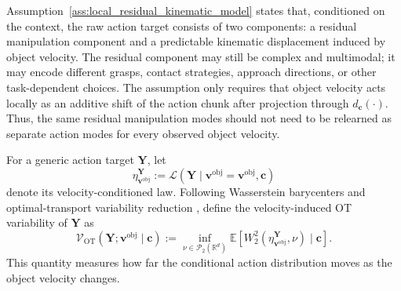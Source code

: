 \documentclass[10pt,twocolumn,letterpaper]{article}
\begin{document}
Assumption~\ref{ass:local_residual_kinematic_model} states that, conditioned on
the context, the raw action target consists of two components: a residual
manipulation component and a predictable kinematic displacement induced by
object velocity. The residual component may still be complex and multimodal; it
may encode different grasps, contact strategies, approach directions, or other
task-dependent choices. The assumption only requires that object velocity acts
locally as an additive shift of the action chunk after projection through
$d_{\mathbf c}(\cdot)$. Thus, the same residual manipulation modes should not
need to be relearned as separate action modes for every observed object
velocity.

For a generic action target $\mathbf Y$, let
\[
    \eta_{\mathbf v^\text{obj}}^{\mathbf Y}
    :=
    \mathcal L(\mathbf Y \mid \mathbf v^\text{obj}=\mathbf v^\text{obj},\mathbf c)
\]
denote its velocity-conditioned law. Following Wasserstein barycenters and
optimal-transport variability reduction
\citep{agueh2011barycenters,villani2009optimal,hung2022variability}, define the
velocity-induced OT variability of $\mathbf Y$ as
\begin{equation}
    \mathcal V_{\mathrm{OT}}(\mathbf Y;\mathbf v^\text{obj}\mid\mathbf c)
    :=
    \inf_{\nu\in\mathcal P_2(\mathbb R^d)}
    \mathbb E
    \left[
        W_2^2
        \left(
            \eta_{\mathbf v^\text{obj}}^{\mathbf Y},
            \nu
        \right)
        \mid \mathbf c
    \right].
    \label{eq:velocity_ot_variability}
\end{equation}
This quantity measures how far the conditional action distribution moves as the
object velocity changes.
\end{document}
